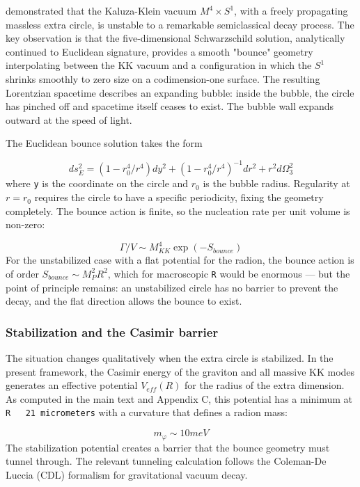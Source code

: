 \documentclass[aps,prd,preprint,superscriptaddress,longbibliography,floatfix]{revtex4-2}
\theoremstyle{remark}
\begin{document}
\cite{Witten1982} demonstrated that the Kaluza-Klein vacuum $M^{4} \times S^{1}$, with a freely propagating massless extra circle, is unstable to a remarkable semiclassical decay process. The key observation is that the five-dimensional Schwarzschild solution, analytically continued to Euclidean signature, provides a smooth "bounce" geometry interpolating between the KK vacuum and a configuration in which the $S^{1}$ shrinks smoothly to zero size on a codimension-one surface. The resulting Lorentzian spacetime describes an expanding bubble: inside the bubble, the circle has pinched off and spacetime itself ceases to exist. The bubble wall expands outward at the speed of light.

The Euclidean bounce solution takes the form


\begin{equation}
    ds^{2}_E = (1 - r_{0}^{4}/r^{4}) dy^{2} + (1 - r_{0}^{4}/r^{4})^{-1} dr^{2} + r^{2} d\Omega_{3}^{2}
\end{equation}
where \texttt{y} is the coordinate on the circle and $r_{0}$ is the bubble radius. Regularity at $r = r_{0}$ requires the circle to have a specific periodicity, fixing the geometry completely. The bounce action is finite, so the nucleation rate per unit volume is non-zero:


\begin{equation}
    \Gamma / V \sim  M_{KK}^{4} \exp(-S_{bounce})
\end{equation}
For the unstabilized case with a flat potential for the radion, the bounce action is of order $S_{bounce} \sim  M_P^{2} R^{2}$, which for macroscopic \texttt{R} would be enormous --- but the point of principle remains: an unstabilized circle has no barrier to prevent the decay, and the flat direction allows the bounce to exist.


\subsubsection{Stabilization and the Casimir barrier}

The situation changes qualitatively when the extra circle is stabilized. In the present framework, the Casimir energy of the graviton and all massive KK modes generates an effective potential $V_{eff}(R)$ for the radius of the extra dimension. As computed in the main text and Appendix C, this potential has a minimum at \texttt{R ~ 21 micrometers} with a curvature that defines a radion mass:


\begin{equation}
    m_\varphi \sim  10 meV
\end{equation}
The stabilization potential creates a barrier that the bounce geometry must tunnel through. The relevant tunneling calculation follows the Coleman-De Luccia (CDL) formalism for gravitational vacuum decay.
\end{document}
